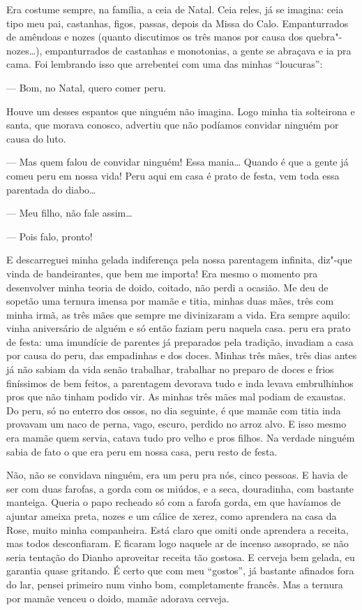\begin{linenumbers}
Era costume sempre, na família, a ceia de Natal. Ceia reles, já se
imagina: ceia tipo meu pai, castanhas, figos, passas, depois da Missa do
Calo. Empanturrados de amêndoas e nozes (quanto discutimos os três manos
por causa dos quebra"-nozes\ldots{}), empanturrados de castanhas e monotonias,
a gente se abraçava e ia pra cama. Foi lembrando isso que arrebentei com
uma das minhas ``loucuras'':

--- Bom, no Natal, quero comer peru.

Houve um desses espantos que ninguém não imagina. Logo minha tia
solteirona e santa, que morava conosco, advertiu que não podíamos
convidar ninguém por causa do luto.

--- Mas quem falou de convidar ninguém! Essa mania\ldots{} Quando é que a
gente já comeu peru em nossa vida! Peru aqui em casa é prato de festa,
vem toda essa parentada do diabo\ldots{}

--- Meu filho, não fale assim\ldots{}

--- Pois falo, pronto!

E descarreguei minha gelada indiferença pela nossa parentagem infinita,
diz"-que vinda de bandeirantes, que bem me importa! Era mesmo o momento
pra desenvolver minha teoria de doido, coitado, não perdi a ocasião. Me
deu de sopetão uma ternura imensa por mamãe e titia, minhas duas mães,
três com minha irmã, as três mães que sempre me divinizaram a vida. Era
sempre aquilo: vinha aniversário de alguém e só então faziam peru
naquela casa. peru era prato de festa: uma imundície de parentes já
preparados pela tradição, invadiam a casa por causa do peru, das
empadinhas e dos doces. Minhas três mães, três dias antes já não sabiam
da vida senão trabalhar, trabalhar no preparo de doces e frios
finíssimos de bem feitos, a parentagem devorava tudo e inda levava
embrulhinhos pros que não tinham podido vir. As minhas três mães mal
podiam de exaustas. Do peru, só no enterro dos ossos, no dia seguinte, é
que mamãe com titia inda provavam um naco de perna, vago, escuro,
perdido no arroz alvo. E isso mesmo era mamãe quem servia, catava tudo
pro velho e pros filhos. Na verdade ninguém sabia de fato o que era peru
em nossa casa, peru resto de festa.

Não, não se convidava ninguém, era um peru pra nós, cinco pessoas. E
havia de ser com duas farofas, a gorda com os miúdos, e a seca,
douradinha, com bastante manteiga. Queria o papo recheado só com a
farofa gorda, em que havíamos de ajuntar ameixa preta, nozes e um cálice
de xerez, como aprendera na casa da Rose, muito minha companheira. Está
claro que omiti onde aprendera a receita, mas todos desconfiaram. E
ficaram logo naquele ar de incenso assoprado, se não seria tentação do
Dianho aproveitar receita tão gostosa. E cerveja bem gelada, eu garantia
quase gritando. É certo que com meu ``gostos'', já bastante afinados
fora do lar, pensei primeiro num vinho bom, completamente francês. Mas a
ternura por mamãe venceu o doido, mamãe adorava cerveja.


\end{linenumbers}
